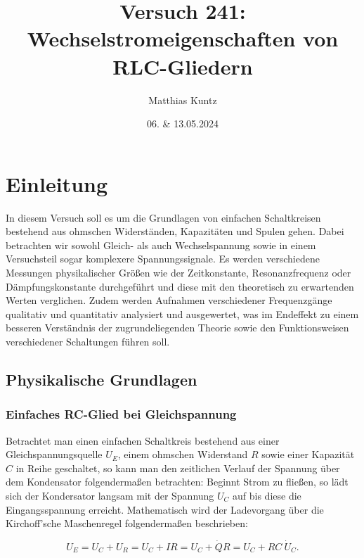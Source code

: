 \documentclass{article}
\title{Versuch 241: Wechselstromeigenschaften von RLC-Gliedern}
\author{Matthias Kuntz}
\date{06. \& 13.05.2024}
\begin{document}
\maketitle

\tableofcontents

\newpage

\section{Einleitung}

In diesem Versuch soll es um die Grundlagen von einfachen Schaltkreisen bestehend aus ohmschen Widerständen, Kapazitäten und Spulen gehen. Dabei betrachten wir sowohl Gleich- als auch Wechselspannung sowie in einem Versuchsteil sogar komplexere Spannungssignale. Es werden verschiedene Messungen physikalischer Größen wie der Zeitkonstante, Resonanzfrequenz oder Dämpfungskonstante durchgeführt und diese mit den theoretisch zu erwartenden Werten verglichen. Zudem werden Aufnahmen verschiedener Frequenzgänge qualitativ und quantitativ analysiert und ausgewertet, was im Endeffekt zu einem besseren Verständnis der zugrundeliegenden Theorie sowie den Funktionsweisen verschiedener Schaltungen führen soll.


\subsection{Physikalische Grundlagen}

\subsubsection{Einfaches RC-Glied bei Gleichspannung}

Betrachtet man einen einfachen Schaltkreis bestehend aus einer Gleichspannungsquelle $U_E$, einem ohmschen Widerstand $R$ sowie einer Kapazität $C$ in Reihe geschaltet, so kann man den zeitlichen Verlauf der Spannung über dem Kondensator folgendermaßen betrachten: Beginnt Strom zu fließen, so lädt sich der Kondersator langsam mit der Spannung $U_C$ auf bis diese die Eingangsspannung erreicht. Mathematisch wird der Ladevorgang über die Kirchoff'sche Maschenregel folgendermaßen beschrieben:

\begin{equation}
    U_E = U_C + U_R = U_C + IR = U_C + \dot{Q} R = U_C + RC \ \dot{U}_C.
\end{equation}
\end{document}
